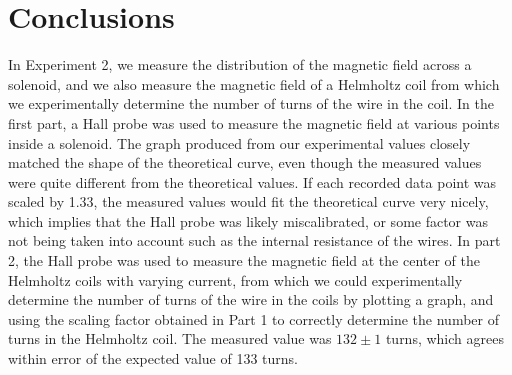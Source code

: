 \documentclass[letterpaper]{article}
\begin{document}
\section{Conclusions}

In Experiment 2, we measure the distribution of the magnetic field across a solenoid,
and we also measure the magnetic field of a Helmholtz coil from which we experimentally determine the
number of turns of the wire in the coil. In the first part, a Hall probe was used to measure the magnetic field
at various points inside a solenoid. The graph produced from our experimental values
closely matched the shape of the theoretical curve, even though the measured values were
quite different from the theoretical values. If each recorded
data point was scaled by 1.33, the measured values would fit the
theoretical curve very nicely, which implies that the Hall probe
was likely miscalibrated, or some factor was not being taken into account such as the internal resistance
of the wires. In part 2, the Hall probe was used to measure the magnetic field
at the center of the Helmholtz coils with varying current, from which we could experimentally
determine the number of turns of the wire in the coils by plotting a graph, and using the scaling factor obtained in Part 1
to correctly determine the number of turns in the Helmholtz coil. The measured value was $132 \pm 1$ turns, which agrees
within error of the expected value of 133 turns.


\end{document}
